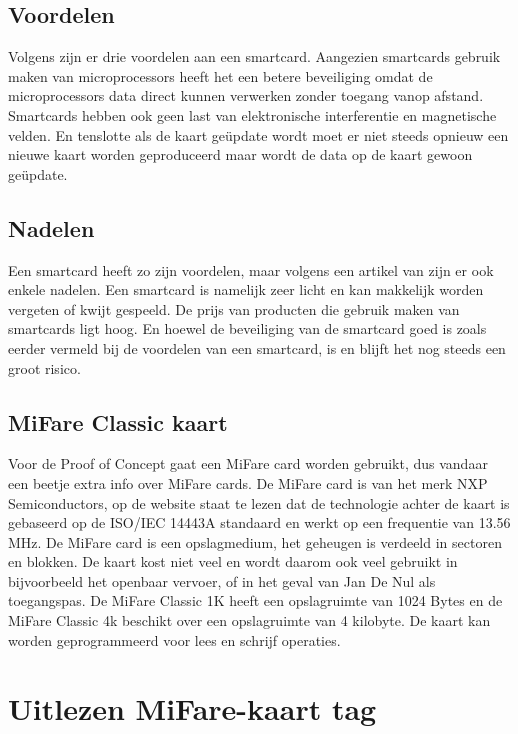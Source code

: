 \subsection{Voordelen}
Volgens \textcite{SwatiTawdeSmartCard} zijn er drie voordelen aan een smartcard. Aangezien smartcards gebruik maken van microprocessors heeft het een betere beveiliging omdat de microprocessors data direct kunnen verwerken zonder toegang vanop afstand. Smartcards hebben ook geen last van elektronische interferentie en magnetische velden. En tenslotte als de kaart geüpdate wordt moet er niet steeds opnieuw een nieuwe kaart worden geproduceerd maar wordt de data op de kaart gewoon geüpdate.

\subsection{Nadelen}
Een smartcard heeft zo zijn voordelen, maar volgens een artikel van \textcite{SageSmartCard} zijn er ook enkele nadelen. Een smartcard is namelijk zeer licht en kan makkelijk worden vergeten of kwijt gespeeld. De prijs van producten die gebruik maken van smartcards ligt hoog. En hoewel de beveiliging van de smartcard goed is zoals eerder vermeld bij de voordelen van een smartcard, is en blijft het nog steeds een groot risico.

\subsection{MiFare Classic kaart}
Voor de Proof of Concept gaat een MiFare card worden gebruikt, dus vandaar een beetje extra info over MiFare cards.
De MiFare card is van het merk NXP Semiconductors, op de \textcite{MiFareSmartCard} website staat te lezen dat de technologie achter de kaart is gebaseerd op de ISO/IEC 14443A standaard en werkt op een frequentie van 13.56 MHz. De MiFare card is een opslagmedium, het geheugen is verdeeld in sectoren en blokken. De kaart kost niet veel en wordt daarom ook veel gebruikt in bijvoorbeeld het openbaar vervoer, of in het geval van Jan De Nul als toegangspas.
De MiFare Classic 1K heeft een opslagruimte van 1024 Bytes en de MiFare Classic 4k beschikt over een opslagruimte van 4 kilobyte. De kaart kan worden geprogrammeerd voor lees en schrijf operaties.




\section{Uitlezen MiFare-kaart tag}
